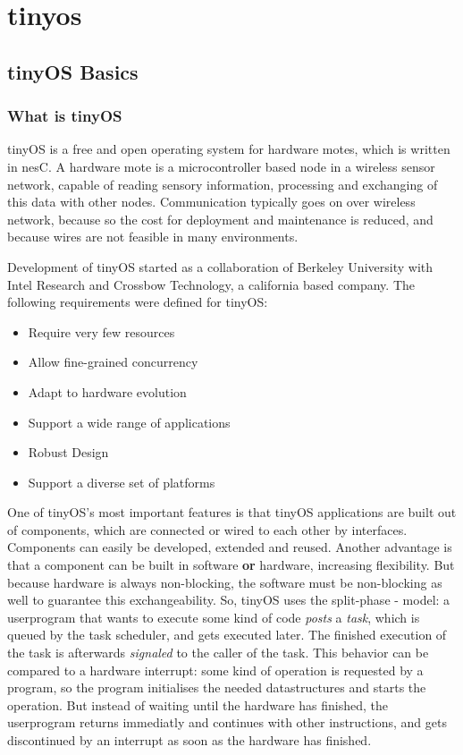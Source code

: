 
\chapter{tinyos} \label{chapter:tinyos}

\section{tinyOS Basics}

\subsection{What is tinyOS}

tinyOS is a free and open operating system for hardware motes, which is written in nesC. A hardware mote is a microcontroller based node in a wireless sensor network, capable of reading sensory information, processing and exchanging of this data with other nodes. Communication typically goes on over wireless network, because so the cost for deployment and maintenance is reduced, and because wires are not feasible in many environments. 

Development of tinyOS started as a collaboration of Berkeley University with Intel Research and Crossbow Technology, a california based company.
The following requirements were defined for tinyOS:

\begin{itemize}
 \item Require very few resources
 \item Allow fine-grained concurrency
 \item Adapt to hardware evolution
 \item Support a wide range of applications
 \item Robust Design
 \item Support a diverse set of platforms
\end{itemize}

One of tinyOS's most important features is that tinyOS applications are built out of components, which are connected or wired to each other by interfaces. Components can easily be developed, extended and reused. Another advantage is that a component can be built in software \textbf{or} hardware, increasing flexibility. But because hardware is always non-blocking, the software must be non-blocking as well to guarantee this exchangeability. So, tinyOS uses the split-phase - model: a userprogram that wants to execute some kind of code \textit{posts} a \textit{task}, which is queued by the task scheduler, and gets executed later. The finished execution of the task is afterwards \textit{signaled} to the caller of the task. This behavior can be compared to a hardware interrupt: some kind of operation is requested by a program, so the program initialises the needed datastructures and starts the operation. But instead of waiting until the hardware has finished, the userprogram returns immediatly and continues with other instructions, and gets discontinued by an interrupt as soon as the hardware has finished.

